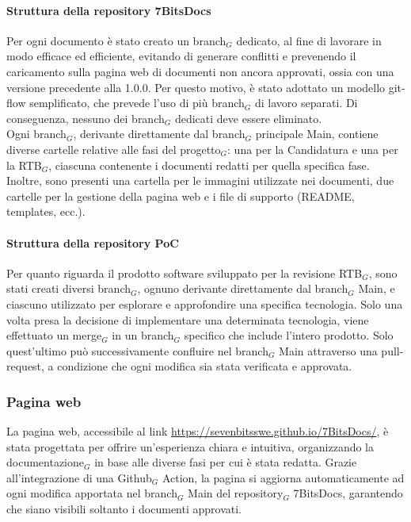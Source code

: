 \documentclass[10pt]{article}
\begin{document}
\begin{justify}
        \paragraph{Struttura della repository 7BitsDocs}
        Per ogni documento è stato creato un branch$_G$ dedicato, al fine di lavorare in modo efficace ed efficiente, evitando di generare conflitti e prevenendo il caricamento sulla pagina web di documenti non ancora approvati, ossia con una versione precedente alla 1.0.0. Per questo motivo, è stato adottato un modello git-flow semplificato, che prevede l'uso di più branch$_G$ di lavoro separati. Di conseguenza, nessuno dei branch$_G$ dedicati deve essere eliminato.\\
        Ogni branch$_G$, derivante direttamente dal branch$_G$ principale Main, contiene diverse cartelle relative alle fasi del progetto$_G$: una per la Candidatura e una per la RTB$_G$, ciascuna contenente i documenti redatti per quella specifica fase. Inoltre, sono presenti una cartella per le immagini utilizzate nei documenti, due cartelle per la gestione della pagina web e i file di supporto (README, templates, ecc.).

        \paragraph{Struttura della repository PoC}
        Per quanto riguarda il prodotto software sviluppato per la revisione RTB$_G$, sono stati creati diversi branch$_G$, ognuno derivante direttamente dal branch$_G$ Main, e ciascuno utilizzato per esplorare e approfondire una specifica tecnologia. Solo una volta presa la decisione di implementare una determinata tecnologia, viene effettuato un merge$_G$ in un branch$_G$ specifico che include l'intero prodotto. Solo quest'ultimo può successivamente confluire nel branch$_G$ Main attraverso una pull-request, a condizione che ogni modifica sia stata verificata e approvata.
    
    \subsubsection{Pagina web} 
    La pagina web, accessibile al link \href{https://sevenbitsswe.github.io/7BitsDocs/}{https://sevenbitsswe.github.io/7BitsDocs/}, è stata progettata per offrire un'esperienza chiara e intuitiva, organizzando la documentazione$_G$ in base alle diverse fasi per cui è stata redatta. Grazie all'integrazione di una Github$_G$ Action, la pagina si aggiorna automaticamente ad ogni modifica apportata nel branch$_G$ Main del repository$_G$ 7BitsDocs, garantendo che siano visibili soltanto i documenti approvati.


\end{justify}
\end{document}
